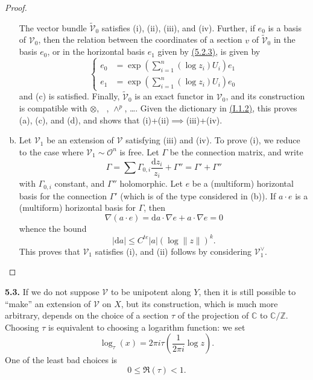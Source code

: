 \documentclass{report}
\newenvironment{rmenv}[1]
  {\phantomsection\par\medskip\noindent\textbf{#1.}\rmfamily}
  {\par\medskip}
\renewcommand{\cal}[1]{{\mathcal{#1}}}
\newcommand{\CC}{\mathbb{C}}
\newcommand{\ZZ}{\mathbb{Z}}
\newcommand{\dd}{\mathrm{d}}
\renewcommand{\leq}{\leqslant}
\DeclareMathOperator{\shHom}{\underline{Hom}}
\begin{document}
\begin{proof}
\begin{enumerate}[(a)]
      The vector bundle $\widetilde{\cal{V}}_0$ satisfies (i), (ii), (iii), and (iv).
      Further, if $e_0$ is a basis of $\cal{V}_0$, then the relation between the coordinates of a section $v$ of $\widetilde{\cal{V}}_0$ in the basis $e_0$, or in the horizontal basis $e_1$ given by \hyperref[II.5.2.3]{(5.2.3)}, is given by
      \[
        \begin{cases}
          e_0 &= \exp\left(\sum_{i=1}^n(\log z_i)U_i\right)e_1
        \\e_1 &= \exp\left(\sum_{i=1}^n(\log z_i)U_i\right)e_0
        \end{cases}
      \]
      and (c) is satisfied.
      Finally, $\widetilde{\cal{V}}_0$ is an exact functor in $\cal{V}_0$, and its construction is compatible with $\otimes$, $\shHom$, $\wedge^p$, \ldots.
      Given the dictionary in \hyperref[I.1.2]{(I.1.2)}, this proves (a), (c), and (d), and shows that (i)+(ii)$\implies$(iii)+(iv).

    \item Let $\cal{V}_1$ be an extension of $\cal{V}$ satisfying (iii) and (iv).
      To prove (i), we reduce to the case where $\cal{V}_1\sim\cal{O}^n$ is free.
      Let $\Gamma$ be the connection matrix, and write
      \[
        \Gamma
        = \sum\Gamma_{0,i}\frac{\dd z_i}{z_i} + \Gamma''
        = \Gamma'+\Gamma''
      \]
      with $\Gamma_{0,i}$ constant, and $\Gamma''$ holomorphic.
      Let $e$ be a (multiform) horizontal basis for the connection $\Gamma'$ (which is of the type considered in (b)).
      If $a\cdot e$ is a (multiform) horizontal basis for $\Gamma$, then
      \[
        \nabla (a\cdot e)
        = \dd a\cdot\nabla e + a\cdot\nabla e
        = 0
      \]
      whence the bound
      \[
        |\dd a| \leq C^{te}|a|(\log\|z\|)^k.
      \]
      This proves that $\cal{V}_1$ satisfies (i), and (ii) follows by considering $\cal{V}_1^\vee$.
  \end{enumerate}
\end{proof}

\begin{rmenv}{5.3}
\label{II.5.3}
  If we do not suppose $\cal{V}$ to be unipotent along $Y$, then it is still possible to ``make'' an extension of $\cal{V}$ on $X$, but its construction, which is much more arbitrary, depends on the choice of a section $\tau$ of the projection of $\CC$ to $\CC/\ZZ$.
  Choosing $\tau$ is equivalent to choosing a logarithm function: we set
  \[
    \log_\tau(x) = 2\pi i\tau\left(\frac{1}{2\pi i}\log z\right).
  \]
  One of the least bad choices is
  \[
  \label{II.5.3.1}
    0 \leq \Re(\tau) < 1.
  \tag{5.3.1}
  \]
\end{rmenv}
\end{document}
